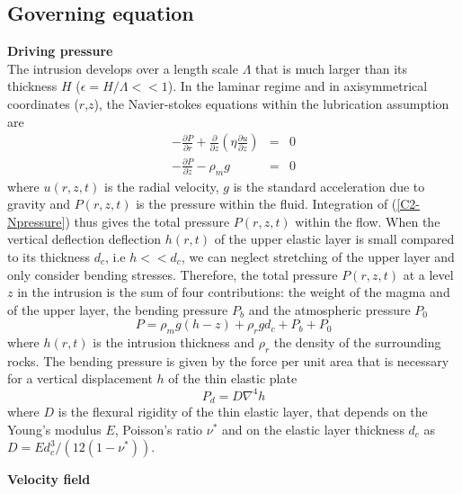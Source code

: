 \subsection{Governing equation}
\label{C2-sec:Governing equation}

\textbf{Driving pressure}\\

The  intrusion develops  over a  length scale  $\Lambda$ that  is much
larger than its  thickness $H$ ($\epsilon = H/ \Lambda<<  1$).  In the
laminar  regime  and  in  axisymmetrical  coordinates  ($r$,$z$),  the
Navier-stokes equations within the lubrication assumption are
\begin{eqnarray}
  -\frac{\partial P}{\partial r}  +  \frac{\partial}{\partial z}\left(\eta \frac{\partial u}{\partial z}\right) &=&0\label{C2_V1} \\
  -\frac{\partial P}{\partial z}  - \rho_{m}g&  =&0\label{C2-Npressure}
\end{eqnarray}
where  $u(r,z,t)$  is  the  radial   velocity,  $g$  is  the  standard
acceleration due to gravity and  $P(r,z,t)$ is the pressure within the
fluid.   Integration  of  (\ref{C2-Npressure}) thus  gives  the  total
pressure  $P(r,z,t)$ within  the flow.   When the  vertical deflection
deflection $h(r,t)$  of the upper  elastic layer is small  compared to
its thickness  $d_c$, i.e $h<<d_c$,  we can neglect stretching  of the
upper layer and only consider  bending stresses.  Therefore, the total
pressure $P(r,z,t)$ at a level $z$ in the intrusion is the sum of four
contributions: the  weight of the  magma and  of the upper  layer, the
bending pressure $P_b$ and the atmospheric pressure $P_0$
\begin{equation}
  P = \rho_m g (h-z)+\rho_rgd_c+P_b+P_0
  \label{C2-pression}
\end{equation}
where $h(r,t)$ is the intrusion  thickness and $\rho_r$ the density of
the surrounding rocks. The bending pressure  is given by the force per
unit area  that is necessary  for a  vertical displacement $h$  of the
thin elastic plate \citep{Turcotte:1982ca}
\begin{equation}
  P_d = D\nabla^4h
\end{equation}
where $D$  is the flexural  rigidity of  the thin elastic  layer, that
depends on the Young's modulus $E$, Poisson's ratio $\nu^*$ and on the
elastic           layer          thickness           $d_c$          as
$D = Ed_c^3/\left(12(1-\nu^*)\right)$.

\vspace{.5cm} \textbf{Velocity field} \vspace{.5cm}

